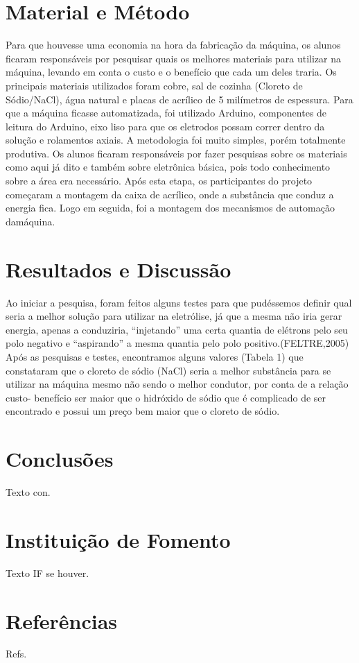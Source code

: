 \documentclass[article,12pt,onesidea,4paper,english,brazil]{abntex2}
\begin{document}
	\section*{Material e Método}
	
	Para que houvesse uma economia na hora da fabricação da máquina, os alunos ficaram responsáveis por pesquisar quais os melhores materiais para utilizar na máquina, levando em conta o custo e o benefício que cada um deles traria. Os principais materiais utilizados foram cobre, sal de cozinha (Cloreto de Sódio/NaCl), água natural e placas de acrílico de 5 milímetros de espessura. Para que a máquina ficasse automatizada, foi utilizado Arduino, componentes de leitura do Arduino, eixo liso para que os eletrodos possam correr dentro da solução e rolamentos axiais.
	A metodologia foi muito simples, porém totalmente produtiva. Os alunos  ficaram responsáveis por fazer pesquisas sobre os materiais como aqui já dito e também sobre eletrônica básica, pois todo conhecimento sobre a área era necessário. Após esta etapa, os participantes do projeto começaram a montagem da caixa de acrílico, onde a substância que conduz a energia fica. Logo em seguida, foi a montagem dos mecanismos de automação damáquina.
	
	
	
	\section*{Resultados e Discussão}
	
	Ao iniciar a pesquisa, foram feitos alguns testes para que pudéssemos definir qual seria a melhor solução para utilizar na eletrólise, já que a mesma não iria gerar energia, apenas a conduziria, “injetando” uma certa quantia de elétrons pelo seu polo negativo e “aspirando” a mesma quantia pelo polo positivo.(FELTRE,2005)
	Após as pesquisas e testes, encontramos alguns valores (Tabela 1) que constataram que o cloreto de sódio (NaCl) seria a melhor substância para se utilizar na máquina mesmo não sendo o melhor condutor, por conta de a relação custo- benefício ser maior que o hidróxido de sódio que é complicado de ser encontrado e possui um preço bem maior que o cloreto de sódio.
	\begin{figure}[t]
		
	\end{figure}
	
	
	
	\section*{Conclusões}
	
	Texto con.
	
	\section*{Instituição de Fomento}
	
	Texto IF se houver.
	
	\section*{Referências}
	
	Refs.
	
\end{document}
